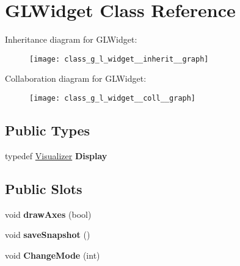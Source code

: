 \hypertarget{class_g_l_widget}{\section{G\-L\-Widget Class Reference}
\label{class_g_l_widget}
}


Inheritance diagram for G\-L\-Widget\-:\nopagebreak
\begin{figure}[H]
\begin{center}
\leavevmode
\texttt{[image: class\_g\_l\_widget\_\_inherit\_\_graph]}
\end{center}
\end{figure}


Collaboration diagram for G\-L\-Widget\-:\nopagebreak
\begin{figure}[H]
\begin{center}
\leavevmode
\texttt{[image: class\_g\_l\_widget\_\_coll\_\_graph]}
\end{center}
\end{figure}
\subsection*{Public Types}
\begin{DoxyCompactItemize}
\item 
\hypertarget{class_g_l_widget_a5ee4f2222a72d52e211cbe47bfb74807}{typedef \hyperlink{class_visualizer}{Visualizer} {\bfseries Display}}\label{class_g_l_widget_a5ee4f2222a72d52e211cbe47bfb74807}

\end{DoxyCompactItemize}
\subsection*{Public Slots}
\begin{DoxyCompactItemize}
\item 
\hypertarget{class_g_l_widget_a133cbc2c72a274f0175edc01f7b3d807}{void {\bfseries draw\-Axes} (bool)}\label{class_g_l_widget_a133cbc2c72a274f0175edc01f7b3d807}

\item 
\hypertarget{class_g_l_widget_a485193a89a6340023e5bc7256fa8b0b7}{void {\bfseries save\-Snapshot} ()}\label{class_g_l_widget_a485193a89a6340023e5bc7256fa8b0b7}

\item 
\hypertarget{class_g_l_widget_a459a667a4f8aafdcf420ede286a25b2e}{void {\bfseries Change\-Mode} (int)}\label{class_g_l_widget_a459a667a4f8aafdcf420ede286a25b2e}

\end{DoxyCompactItemize}
